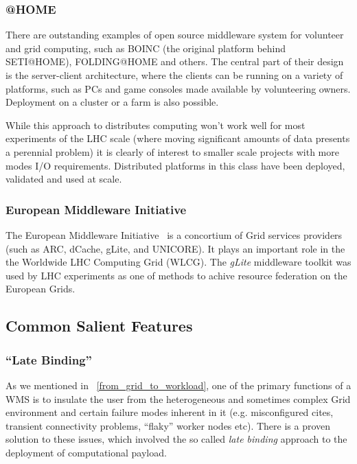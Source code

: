\subsubsection{@HOME}
There are outstanding examples of open source middleware system for volunteer and grid computing, such as BOINC (the original platform behind SETI@HOME),
FOLDING@HOME and others. The central part of their design is the server-client architecture, where the clients can be running on a variety of platforms,
such as PCs and game consoles made available by volunteering owners. Deployment on a cluster or a farm is also possible.

While this approach to distributes computing won't work well for most experiments of the LHC scale (where moving significant amounts of data presents a perennial problem) it is clearly of
interest to smaller scale projects with more modes I/O requirements. Distributed platforms in this class have been deployed, validated and used at scale.

\subsubsection{European Middleware Initiative}
The European Middleware Initiative~\cite{emi} is a concortium of Grid services providers (such as ARC, dCache, gLite, and UNICORE).
It plays an important role in the the Worldwide LHC Computing Grid (WLCG). The \textit{gLite} middleware toolkit was used by LHC experiments as one of methods
to achive resource federation on the European Grids. 

\subsection{Common Salient Features}

\subsubsection{``Late Binding''}
As we mentioned in ~\ref{from_grid_to_workload}, one of the primary functions of a WMS is to insulate the user from the heterogeneous and sometimes complex
Grid environment and certain failure modes inherent in it (e.g. misconfigured cites, transient connectivity problems, ``flaky'' worker nodes etc).
There is a proven solution to these issues, which involved the so called \textit{late binding} approach  to the deployment of computational payload.

